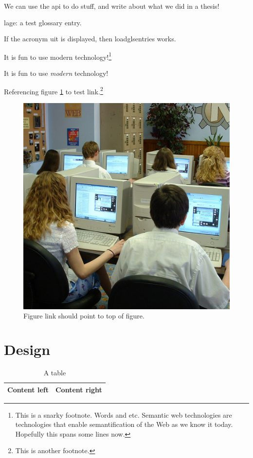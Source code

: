 \documentclass[final,11pt,baselinegrid]{../../uit-thesis}
\begin{document}
We can use the \ac{api} to do stuff, and write about what we did in a \gls{thesis}!

\Gls{lage}: a test glossary entry.

If the acronym \ac{uit} is displayed, then loadglsentries works.

It is fun to use modern  technology!\footnote{This is a snarky
footnote. Words and etc. Semantic web technologies are technologies that enable
semantification of the Web as we know it today. Hopefully this spans some lines
now.}

It is fun to use \emph{modern } technology!

Referencing figure \ref{fig:ex} to test link.\footnote{This is another
footnote.}

\begin{figure}\label{fig:ex}
\centering
\includegraphics[scale=0.1]{748443511_095ae916df_o.jpg}
\caption{Figure link should point to top of figure.}
\end{figure}

\chapter{Design}
\lipsum[8-10]

\begin{table}
\centering
\begin{tabular}{|l|l|}
\hline
Content left & Content right\\
\hline
\end{tabular}
\caption{A table}
\end{table}
\end{document}
